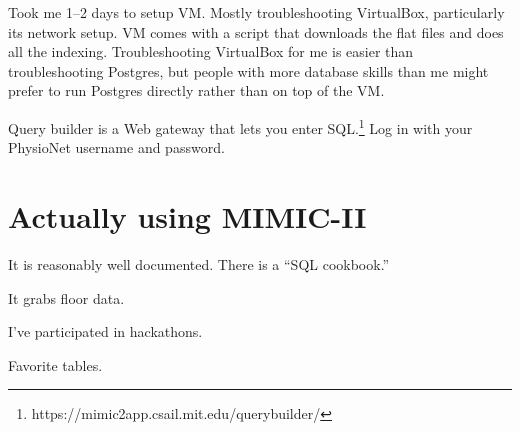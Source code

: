 \documentclass{tufte-handout}
\begin{document}
Took me 1--2 days to setup VM. Mostly troubleshooting VirtualBox,
particularly its network setup. VM comes with a script that downloads
the flat files and does all the indexing. Troubleshooting VirtualBox
for me is easier than troubleshooting Postgres, but people with more
database skills than me might prefer to run Postgres directly rather
than on top of the VM.

Query builder is a Web gateway that lets you enter
SQL.\footnote{https://mimic2app.csail.mit.edu/querybuilder/} Log in
with your PhysioNet username and password.

\section{Actually using MIMIC-II}

It is reasonably well documented. There is a ``SQL cookbook.'' 

It grabs floor data.

I've participated in hackathons.

Favorite tables.
\end{document}
